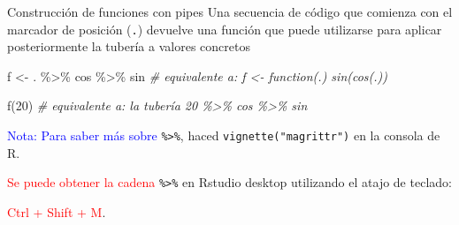 \documentclass[
  ignorenonframetext,
  aspectratio=169]{beamer}
\newenvironment{Shaded}{\begin{snugshade}}{\end{snugshade}}
\newcommand{\CommentTok}[1]{\textcolor[rgb]{0.56,0.35,0.01}{\textit{#1}}}
\newcommand{\DecValTok}[1]{\textcolor[rgb]{0.00,0.00,0.81}{#1}}
\newcommand{\FunctionTok}[1]{\textcolor[rgb]{0.00,0.00,0.00}{#1}}
\newcommand{\NormalTok}[1]{#1}
\newcommand{\OtherTok}[1]{\textcolor[rgb]{0.56,0.35,0.01}{#1}}
\newcommand{\SpecialCharTok}[1]{\textcolor[rgb]{0.00,0.00,0.00}{#1}}
\newcommand\blue[1]{\textcolor{blue}{#1}}
\newcommand\red[1]{\textcolor{red}{#1}}
\begin{document}
\begin{frame}[fragile]{Construcción de funciones con pipes}
\protect\hypertarget{construcciuxf3n-de-funciones-con-pipes}{}
Una secuencia de código que comienza con el marcador de posición
(\texttt{.}) devuelve una función que puede utilizarse para aplicar
posteriormente la tubería a valores concretos

\begin{Shaded}
\begin{Highlighting}[]
\NormalTok{f }\OtherTok{\textless{}{-}}\NormalTok{ . }\SpecialCharTok{\%\textgreater{}\%}\NormalTok{ cos }\SpecialCharTok{\%\textgreater{}\%}\NormalTok{ sin }\CommentTok{\# equivalente a: f \textless{}{-} function(.) sin(cos(.))}
\end{Highlighting}
\end{Shaded}

\begin{Shaded}
\begin{Highlighting}[]
\FunctionTok{f}\NormalTok{(}\DecValTok{20}\NormalTok{) }\CommentTok{\# equivalente a: la tubería 20 \%\textgreater{}\% cos \%\textgreater{}\% sin}
\end{Highlighting}
\end{Shaded}

\blue{Nota: Para saber más sobre} \texttt{\%\textgreater{}\%}, haced
\texttt{vignette("magrittr")} en la consola de R.

\red{Se puede obtener la cadena} \texttt{\%\textgreater{}\%} en Rstudio
desktop utilizando el atajo de teclado:

\red{Ctrl + Shift  + M}.
\end{frame}
\end{document}

